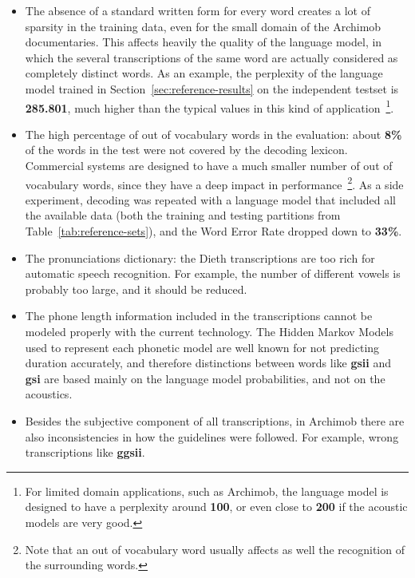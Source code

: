 \documentclass[11pt,a4paper,titlepage,twoside]{article}
\begin{document}
\begin{itemize}

  \item The absence of a standard written form for every word creates a lot of sparsity in the training data, even for the small domain of the Archimob documentaries. This affects heavily the quality of the language model, in which the several transcriptions of the same word are actually considered as completely distinct words. As an example, the perplexity of the language model trained in Section~\ref{sec:reference-results} on the independent testset is \textbf{285.801}, much higher than the typical values in this kind of application~\footnote{For limited domain applications, such as Archimob, the language model is designed to have a perplexity around \textbf{100}, or even close to \textbf{200} if the acoustic models are very good.}.

  \item The high percentage of out of vocabulary words in the evaluation: about \textbf{8\%} of the words in the test were not covered by the decoding lexicon. Commercial systems are designed to have a much smaller number of out of vocabulary words, since they have a deep impact in performance~\footnote{Note that an out of vocabulary word usually affects as well the recognition of the surrounding words.}. As a side experiment, decoding was repeated with a language model that included all the available data (both the training and testing partitions from Table~\ref{tab:reference-sets}), and the Word Error Rate dropped down to \textbf{33\%}.

  \item The pronunciations dictionary: the Dieth transcriptions are too rich for automatic speech recognition. For example, the number of different vowels is probably too large, and it should be reduced.

  \item The phone length information included in the transcriptions cannot be modeled properly with the current technology. The Hidden Markov Models used to represent each phonetic model are well known for not predicting duration accurately, and therefore distinctions between words like \textbf{gsii} and \textbf{gsi} are based mainly on the language model probabilities, and not on the acoustics.

  \item Besides the subjective component of all transcriptions, in Archimob there are also inconsistencies in how the guidelines were followed. For example, wrong transcriptions like \textbf{ggsii}.

\end{itemize}
\end{document}

